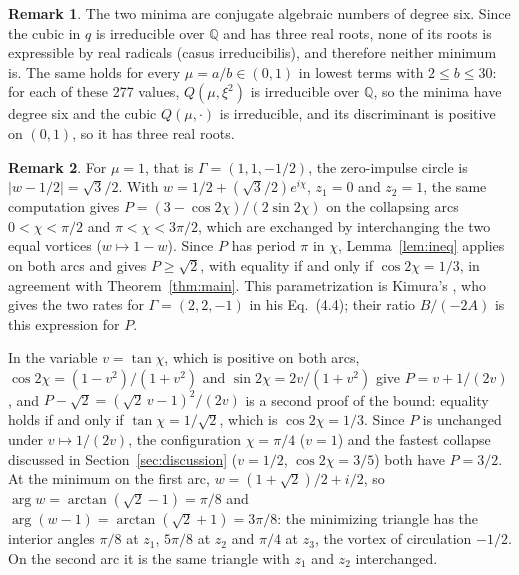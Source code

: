 \documentclass[11pt]{article}
\theoremstyle{definition}
\newtheorem{remark}{Remark}
\newcommand{\Q}{\mathbb{Q}}
\begin{document}
\begin{remark}\label{rem:radicals}
The two minima are conjugate algebraic numbers of degree six. Since the cubic in $q$ is irreducible over $\Q$ and has three real roots, none of its roots is expressible by real radicals (casus irreducibilis), and therefore neither minimum is. The same holds for every $\mu = a/b \in (0, 1)$ in lowest terms with $2 \le b \le 30$: for each of these 277 values, $Q(\mu, \xi^2)$ is irreducible over $\Q$, so the minima have degree six and the cubic $Q(\mu, \cdot)$ is irreducible, and its discriminant is positive on $(0, 1)$, so it has three real roots.
\end{remark}

\begin{remark}\label{rem:equal}
For $\mu = 1$, that is $\Gamma = (1, 1, -1/2)$, the zero-impulse circle is $|w - 1/2| = \sqrt{3}/2$. With $w = 1/2 + (\sqrt{3}/2) e^{i\chi}$, $z_1 = 0$ and $z_2 = 1$, the same computation gives $P = (3 - \cos 2\chi)/(2\sin 2\chi)$ on the collapsing arcs $0 < \chi < \pi/2$ and $\pi < \chi < 3\pi/2$, which are exchanged by interchanging the two equal vortices ($w \mapsto 1 - w$). Since $P$ has period $\pi$ in $\chi$, Lemma~\ref{lem:ineq} applies on both arcs and gives $P \ge \sqrt{2}$, with equality if and only if $\cos 2\chi = 1/3$, in agreement with Theorem~\ref{thm:main}. This parametrization is Kimura's \cite[Sect.~4]{kimura1987}, who gives the two rates for $\Gamma = (2, 2, -1)$ in his Eq.~(4.4); their ratio $B/(-2A)$ is this expression for $P$.

In the variable $v = \tan\chi$, which is positive on both arcs, $\cos 2\chi = (1 - v^2)/(1 + v^2)$ and $\sin 2\chi = 2v/(1 + v^2)$ give $P = v + 1/(2v)$, and $P - \sqrt{2} = (\sqrt{2}\,v - 1)^2/(2v)$ is a second proof of the bound: equality holds if and only if $\tan\chi = 1/\sqrt{2}$, which is $\cos 2\chi = 1/3$. Since $P$ is unchanged under $v \mapsto 1/(2v)$, the configuration $\chi = \pi/4$ ($v = 1$) and the fastest collapse discussed in Section~\ref{sec:discussion} ($v = 1/2$, $\cos 2\chi = 3/5$) both have $P = 3/2$. At the minimum on the first arc, $w = (1 + \sqrt{2})/2 + i/2$, so $\arg w = \arctan(\sqrt{2} - 1) = \pi/8$ and $\arg(w - 1) = \arctan(\sqrt{2} + 1) = 3\pi/8$: the minimizing triangle has the interior angles $\pi/8$ at $z_1$, $5\pi/8$ at $z_2$ and $\pi/4$ at $z_3$, the vortex of circulation $-1/2$. On the second arc it is the same triangle with $z_1$ and $z_2$ interchanged.


\end{remark}
\end{document}
